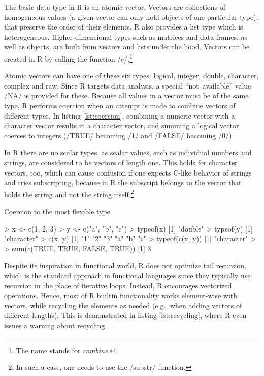 {The basic data type in R is an atomic vector. Vectors are collections of homogeneous values (a given vector can only hold objects of one particular type), that preserve the order of their elements. R also provides a list type which is heterogeneous. Higher-dimensional types such as matrices and data frames, as well as objects, are built from vectors and lists under the hood. Vectors can be created in R by calling the function \rinline/c/.\footnote{The name stands for \emph{combine}.}


Atomic vectors can have one of these six types: logical, integer, double, character, complex and raw. Since R targets data analysis, a special ``not~available'' value \rinline/NA/ is provided for these. Because all values in a vector must be of the same type, R performs coercion when an attempt is made to combine vectors of different types. In listing \ref{lst:coercion}, combining a numeric vector with a character vector results in a character vector, and summing a logical vector coerces to integers (\rinline/TRUE/ becoming \rinline/1/ and \rinline/FALSE/ becoming \rinline/0/).

In R there are no scalar types, as scalar values, such as individual numbers and strings, are considered to be vectors of length one. This holds for character vectors, too, which can cause confusion if one expects C-like behavior of strings and tries subscripting, because in R the subscript belongs to the vector that holds the string and not the string itself.\footnote{In such a case, one needs to use the \rinline/substr/ function.}

\begin{listing}[htbp]
  \caption{\label{lst:coercion}Coercion to the most flexible type}
  \begin{rcode}
> x <- c(1, 2, 3)
> y <- c("a", "b", "c")
> typeof(x)
[1] "double"
> typeof(y)
[1] "character"
> c(x, y)
[1] "1" "2" "3" "a" "b" "c"
> typeof(c(x, y))
[1] "character"
>
> sum(c(TRUE, TRUE, FALSE, TRUE))
[1] 3
  \end{rcode}
\end{listing}

Despite its inspiration in functional world, R does not optimize tail recursion, which is the standard approach in functional languages since they typically use recursion in the place of iterative loops. Instead, R encourages vectorized operations. Hence, most of R builtin functionality works element-wise with vectors, while recycling the elements as needed (e.g., when adding vectors of different lengths). This is demonstrated in listing \ref{lst:recycling}, where R even issues a warning about recycling.

}
